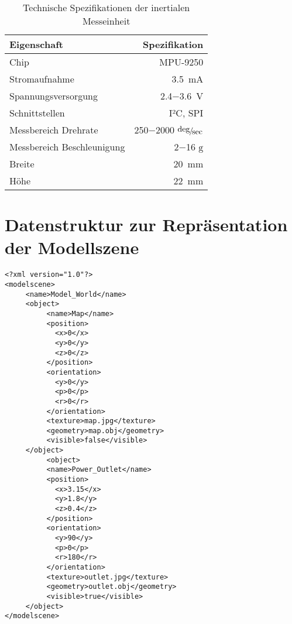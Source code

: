 \begin{table}[ht]
\begin{center}
\setlength{\tabcolsep}{20pt}
\begin{tabular}{lr}
\toprule
Eigenschaft & Spezifikation \\
\midrule
Chip & MPU-9250 \\ \addlinespace
Stromaufnahme & \SI{3,5}{\milli\ampere} \\ \addlinespace
Spannungsversorgung & \SI{2,4}{}$-$\SI{3,6}{\volt} \\ \addlinespace
Schnittstellen & I²C, SPI \\ \addlinespace
Messbereich Drehrate & \SI{250}{}$-$\SI{2000}{} $\nicefrac{\deg}{\sec}$\\ \addlinespace
Messbereich Beschleunigung &  \SI{2}{}$-$\SI{16}{} $\mathrm{g}$\\ \addlinespace
Breite & \SI{20}{\milli\meter} \\ \addlinespace
Höhe & \SI{22}{\milli\meter}\\
\bottomrule
\end{tabular}
\caption{Technische Spezifikationen der inertialen Messeinheit}
\end{center}
\label{tab:imu}
\end{table}

\clearpage{}

\section{Datenstruktur zur Repräsentation der Modellszene}
\label{app.datastructure}
\begin{lstlisting}[label=source.data,caption=Datenstruktur zur Repräsentation der Modellszene]
<?xml version="1.0"?>
<modelscene>
     <name>Model_World</name>
     <object>
          <name>Map</name>
          <position>
          	<x>0</x>
          	<y>0</y>
          	<z>0</z>
          </position>
          <orientation>
          	<y>0</y>
          	<p>0</p>
          	<r>0</r>
          </orientation>
          <texture>map.jpg</texture>
          <geometry>map.obj</geometry>
          <visible>false</visible>
     </object>
          <object>
          <name>Power_Outlet</name>
          <position>
          	<x>3.15</x>
          	<y>1.8</y>
          	<z>0.4</z>
          </position>
          <orientation>
          	<y>90</y>
          	<p>0</p>
          	<r>180</r>
          </orientation>
          <texture>outlet.jpg</texture>
          <geometry>outlet.obj</geometry>
          <visible>true</visible>
     </object>
</modelscene>
\end{lstlisting}

\clearpage{}

%

%
%

